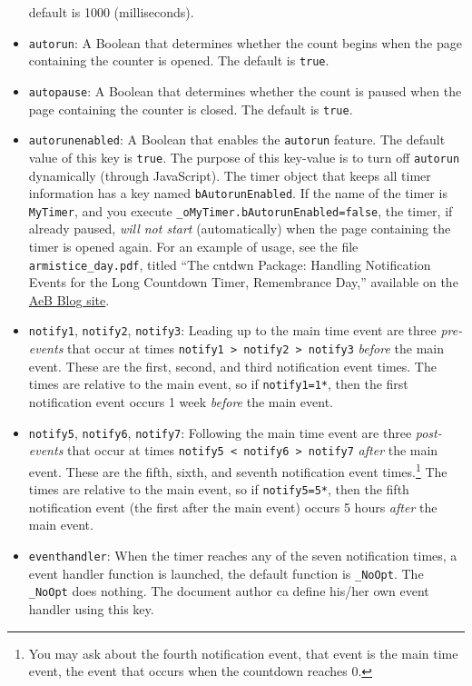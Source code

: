 \documentclass{article}
\begin{document}
\begin{itemize}
    default is 1000 (milliseconds).
    \item \texttt{autorun}: A Boolean that determines whether the count
    begins when the page containing the counter is opened. The default is
    \texttt{true}.
    \item \texttt{autopause}: A Boolean that determines whether the count
    is paused when the page containing the counter is closed. The default is
    \texttt{true}.
    \item \texttt{autorunenabled}: A Boolean that enables the \texttt{autorun}
    feature. The default value of this key is \texttt{true}. The purpose
    of this key-value is to turn off \texttt{autorun} dynamically (through
    JavaScript). The timer object that keeps all timer information has a
    key named \texttt{bAutorunEnabled}. If the name of the timer is
    \texttt{MyTimer}, and you execute
    \texttt{\_oMyTimer.bAutorunEnabled=false}, the timer, if already paused,
    \emph{will not start} (automatically) when the page containing the timer is
    opened again. For an example of usage, see the file
    \texttt{armistice\_day.pdf}, titled ``The cntdwn Package: Handling Notification Events for the Long Countdown
    Timer, Remembrance Day,'' available on the \href{http://www.math.uakron.edu/~dpstory/aebblog.html}{AeB Blog site}.
    \item \texttt{notify1}, \texttt{notify2}, \texttt{notify3}:
        Leading up to the main time event are three \emph{pre-events} that
        occur at times \texttt{notify1 > notify2 > notify3}
        \emph{before} the main event. These are the first, second, and
        third notification event times. The times are relative to the main
        event, so if \texttt{notify1=1*\string\weeks}, then the
        first notification event occurs 1 week \emph{before} the
        main event.
    \item \texttt{notify5}, \texttt{notify6}, \texttt{notify7}:
        Following the main time event are three \emph{post-events}
        that occur at times \texttt{notify5 < notify6 > notify7}
        \emph{after} the main event. These are the fifth, sixth, and
        seventh notification event times.\footnote{You may ask about
        the fourth notification event, that event is the main time
        event, the event that occurs when the countdown reaches 0.}
        The times are relative to the main event, so if
        \texttt{notify5=5*\string\hours}, then the fifth notification
        event (the first after the main event) occurs 5 hours
        \emph{after} the main event.
    \item \texttt{eventhandler}: When the timer reaches any of the
        seven notification times, a event handler function is
        launched, the default function is \texttt{\_NoOpt}. The
        \texttt{\_NoOpt} does nothing. The document author ca define
        his/her own event handler using this key.


\end{itemize}
\end{document}
